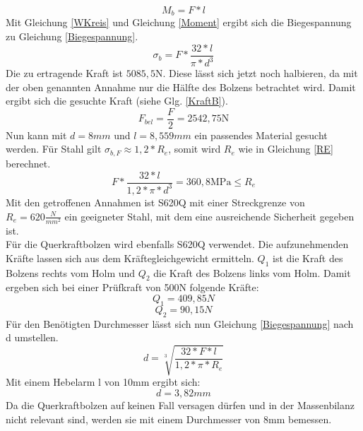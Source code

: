  \begin{equation}
 \label{Moment}
 	M_{b}=F*l
 \end{equation}
 Mit Gleichung \ref{WKreis} und Gleichung \ref{Moment} ergibt sich die Biegespannung zu Gleichung \ref{Biegespannung}.
 \begin{equation}
 \label{Biegespannung}
 	\sigma_{b}=F*\frac{32*l}{\pi*d^{3}}
 \end{equation}
Die zu ertragende Kraft ist $5085,5 \mathrm{N}$. Diese lässt sich jetzt noch halbieren, da mit der oben genannten Annahme nur die Hälfte des Bolzens betrachtet wird. Damit ergibt sich die gesuchte Kraft (siehe Glg. \ref{KraftB}).
 \begin{equation}
 \label{KraftB}
 	F_{bel}=\frac{F}{2} =2542,75 \mathrm{N}
 \end{equation}
 Nun kann mit $d=8mm$ und $l=8,559mm$ ein passendes Material gesucht werden. Für Stahl gilt $\sigma_{b,F}\approx1,2*R_{e}$, somit wird $R_{e}$ wie in Gleichung \ref{RE} berechnet. 
 \begin{equation}
 \label{RE}
 	F*\frac{32*l}{1,2*\pi*d^{3}}=360,8\mathrm{MPa}\leq
R_{e} \end{equation}  
\noindent
Mit den getroffenen Annahmen ist S620Q mit einer Streckgrenze von $R_{e}=620\frac{N}{mm^{2}}$ ein geeigneter Stahl, mit dem eine ausreichende Sicherheit gegeben ist.\\
\noindent
Für die Querkraftbolzen wird ebenfalls S620Q verwendet. Die aufzunehmenden Kräfte lassen sich aus dem Kräftegleichgewicht ermitteln. $Q_{1}$ ist die Kraft des Bolzens rechts vom Holm und $Q_{2}$ die Kraft des Bolzens links vom Holm. Damit ergeben sich bei einer Prüfkraft von 500N folgende Kräfte:
$$Q_{1}=409,85N$$
$$Q_{2}=90,15N$$
Für den Benötigten Durchmesser lässt sich nun Gleichung \ref{Biegespannung} nach d umstellen.
\begin{equation}
d=\sqrt[3]{\frac{32*F*l}{1,2*\pi*R_{e}}}
\end{equation}
Mit einem Hebelarm l von 10mm ergibt sich:
\begin{equation}
d=3,82mm
\end{equation}
Da die Querkraftbolzen auf keinen Fall versagen dürfen und in der Massenbilanz nicht relevant sind, werden sie mit einem Durchmesser von 8mm bemessen.\cite{item6}\\
 
 
 
 
  
 
